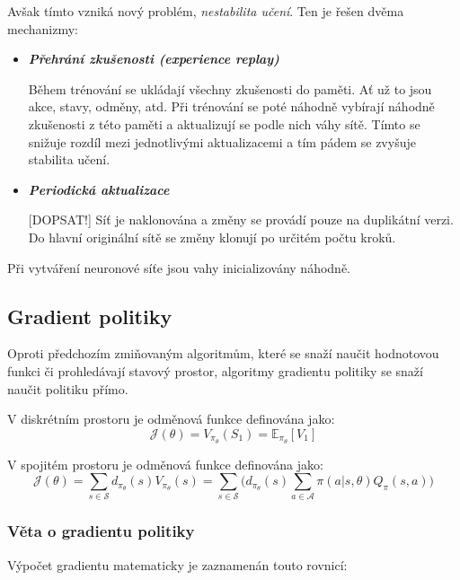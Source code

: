 Avšak tímto vzniká nový problém, \emph{nestabilita učení}.
Ten je řešen dvěma mechanizmy:

\begin{itemize}
  \item \textbf{\emph{Přehrání zkušenosti (experience replay)}}
  
  Během trénování se ukládají všechny zkušenosti do paměti.
  Ať už to jsou akce, stavy, odměny, atd.
  Při trénování se poté náhodně vybírají náhodně zkušenosti z této paměti a aktualizují se podle nich váhy sítě.
  Tímto se snižuje rozdíl mezi jednotlivými aktualizacemi a tím pádem se zvyšuje stabilita učení.
  

  \item \textbf{\emph{Periodická aktualizace}}

  {\color{red}[DOPSAT!]}
  Síť je naklonována a změny se provádí pouze na duplikátní verzi.
  Do hlavní originální sítě se změny klonují po určitém počtu kroků.

\end{itemize}

Při vytváření neuronové síťe jsou vahy inicializovány náhodně.

\subsection{Gradient politiky}\label{subsec:gradient-politiky}
Oproti předchozím zmiňovaným algoritmům, které se snaží naučit hodnotovou funkci či prohledávají stavový prostor, algoritmy gradientu politiky se snaží naučit politiku přímo.

V diskrétním prostoru je odměnová funkce definována jako:
\begin{equation}
  \label{eq:odmenova_funkce}
  \mathcal{J}(\theta) = V_{\pi_\theta}(S_1) = \mathbb{E}_{\pi_\theta}[V_1]
\end{equation}

V spojitém prostoru je odměnová funkce definována jako:
\begin{equation}
    \label{eq:odmenova_funkce_spojita}
  \mathcal{J}(\theta) = \sum_{s \in \mathcal{S}} d_{\pi_\theta}(s) V_{\pi_\theta}(s) = \sum_{s \in \mathcal{S}} \Big( d_{\pi_\theta}(s) \sum_{a \in \mathcal{A}} \pi(a \vert s, \theta) Q_\pi(s, a) \Big)
  \end{equation}

\subsubsection*{Věta o gradientu politiky}
Výpočet gradientu matematicky je zaznamenán touto rovnicí:

